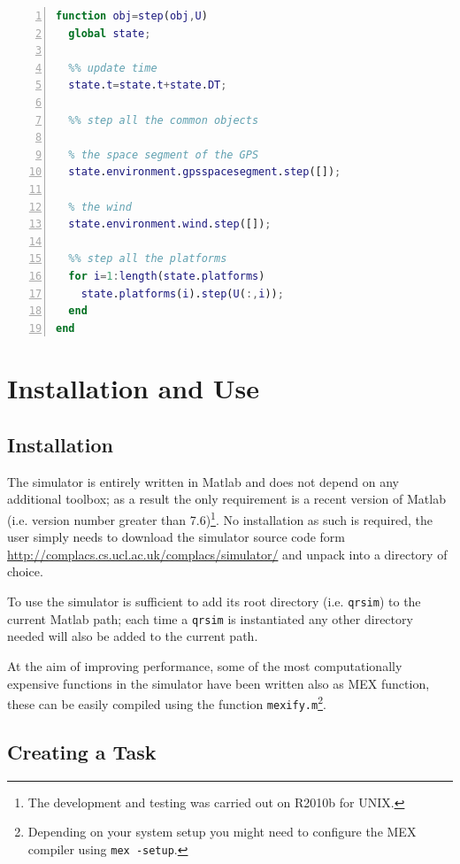 \documentclass[a4paper,11pt]{report}
\newcommand{\sname}{QRsim\xspace}
\newcommand{\web}{\url{http://complacs.cs.ucl.ac.uk/complacs/simulator/}\xspace}
\begin{document}
\begin{lstlisting}[float=ht!bp,caption=\sname step() method,language=Matlab,frame=lines,label=lst:step,numbers=left,basicstyle=\small]
function obj=step(obj,U)
  global state;
           
  %% update time
  state.t=state.t+state.DT;
                        
  %% step all the common objects
            
  % the space segment of the GPS
  state.environment.gpsspacesegment.step([]);
            
  % the wind
  state.environment.wind.step([]);
            
  %% step all the platforms            
  for i=1:length(state.platforms)
    state.platforms(i).step(U(:,i));
  end
end
\end{lstlisting}


\chapter{Installation and Use}

\section{Installation}
The simulator is entirely written in Matlab and does not depend on any additional toolbox; as a result the only requirement is a recent version of Matlab (i.e. version number greater  than 7.6)\footnote{The development and testing was carried out on R2010b for UNIX.}.
No installation as such is required, the user simply needs to download the simulator source code form \web and unpack into a directory of choice.

To use the simulator is sufficient to add its root directory (i.e. \texttt{qrsim}) to the current Matlab path; each time a \texttt{qrsim} is instantiated any other directory needed will also be added to the current path.

At the aim of improving performance, some of the most computationally expensive functions in the simulator have been written also as MEX function, these can be easily compiled using the function \texttt{mexify.m}\footnote{Depending on your system setup you might need to configure the MEX compiler using \texttt{mex -setup}.}.


\section{Creating a Task}  \label{sec:createtask}
\end{document}
